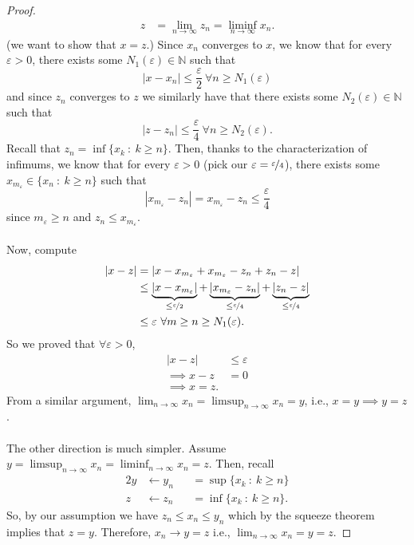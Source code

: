 \documentclass{article}
\newcommand{\N}{\mathbb{N}}
\newcommand{\mylim}[2]{\lim_{#1 \to #2}}
\newcommand{\?}{\stackrel{?}{=}}
\begin{document}
\begin{itemize}
\begin{proof}
\begin{align*}
            z &= \mylim{n}{\infty} z_n = \liminf_{n \to \infty} x_n.
        \end{align*}
        (we want to show that $x = z$.)
        Since $x_n$ converges to $x$, we know that for every $\varepsilon > 0$, there exists some $N_1(\varepsilon) \in \N$ such that
        $$|x - x_n| \leq \frac{\varepsilon}{2} \ \forall n \geq N_1(\varepsilon)$$
        and since $z_n$ converges to $z$ we similarly have that there exists some $N_2(\varepsilon) \in \N$ such that
        $$|z - z_n| \leq \frac{\varepsilon}{4} \ \forall n \geq N_2(\varepsilon).$$
        Recall that $z_n = \inf\{x_k \ : \ k \geq n\}$. Then, thanks to the characterization of infimums, we know that for every $\varepsilon > 0$ (pick our $\varepsilon = \nicefrac{\varepsilon}{4}$), there exists some $x_{m_\varepsilon} \in \{x_n \ : \ k \geq n\}$ such that
        $$|x_{m_\varepsilon} - z_n| = x_{m_\varepsilon} - z_n \leq \frac{\varepsilon}{4}$$
        since $m_\varepsilon \geq n$ and $z_n \leq x_{m_\varepsilon}$. \\\\
        Now, compute
        \begin{align*}
            |x - z| &= |x - x_{m_\varepsilon} + x_{m_\varepsilon} - z_n + z_n - z| \\
            &\leq \underbrace{|x - x_{m_\varepsilon}|}_{\leq \nicefrac{\varepsilon}{2}} + \underbrace{|x_{m_\varepsilon} - z_n|}_{\leq \nicefrac{\varepsilon}{4}} + \underbrace{|z_n - z|}_{\leq \nicefrac{\varepsilon}{4}} \\
            &\leq \varepsilon \ \forall m \geq n \geq N_1(\varepsilon).
        \end{align*}
        So we proved that $\forall \varepsilon > 0$,
        \begin{align*}
            |x - z| &\leq \varepsilon \\
            \implies x - z &= 0 \\
            \implies x = z.
        \end{align*}
        From a similar argument, $\mylim{n}{\infty} x_n = \limsup_{n \to \infty} x_n = y$, i.e., $x = y \implies y = z$. \\\\
        The other direction is much simpler. Assume $y = \limsup_{n \to \infty} x_n = \liminf_{n \to \infty} x_n = z$. Then, recall
        \begin{alignat*}{2}
            y &\leftarrow y_n &&= \sup\{x_k \ : \ k \geq n\} \\
            z &\leftarrow z_n &&= \inf\{x_k \ : \ k \geq n\}.
        \end{alignat*}
        So, by our assumption we have $z_n \leq x_n \leq y_n$ which by the squeeze theorem implies that $z = y$. Therefore, $x_n \rightarrow y = z$ i.e., $\lim_{n \to \infty} x_n = y = z$.
    \end{proof}
\end{itemize}
\end{document}
